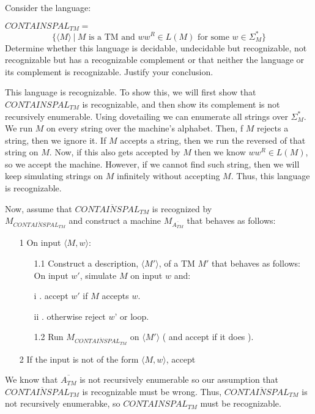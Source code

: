

Consider the language:

$CONTAINSPAL_{TM} =$
	\[  \{ \langle M \rangle ~|~ M \mbox{ is a TM and } ww^R \in L(M) \mbox{ for some } w \in \Sigma_M^* \}
	\]	
	Determine whether this language is decidable, undecidable but recognizable, not recognizable but has a recognizable complement or that neither the language or its complement is recognizable. Justify your conclusion.
	
\begin{solution}

This language is recognizable. To show this, we will first show that $CONTAINSPAL_{TM}$ is recognizable, and then show its complement is not recursively enumerable. Using dovetailing we can enumerate all strings over $\Sigma_M^*$. We run $M$ on every string over the machine's alphabet. Then, f $M$ rejects a string, then we ignore it. If $M$ accepts a string, then we run the reversed of that string on $M$. Now, if this also gets accepted by $M$ then we know $ww^R \in L(M)$, so we accept the machine. However, if we cannot find such string, then we will keep simulating strings on $M$ infinitely without accepting $M$. Thus, this language is recognizable.

Now, assume that $\overline{CONTAINSPAL_{TM}}$ is recognized by\\ $M_{\overline{CONTAINSPAL_{TM}}}$ and construct a machine $M_{\overline{A_{TM}}}$ that behaves as follows:
\begin{enumerate}
	\item [1]On input $\langle M,w \rangle$:
	\begin{enumerate}
		\item 	[1.1] Construct a description, $\langle M' \rangle $, of a TM $M'$ that behaves as
		follows:\\
		On input $w'$, simulate $M$ on input $w$ and:
		\item [i]. accept $w'$ if $M$ accepts $w$.
		\item [ii]. otherwise reject $w’$ or loop.
		\item [1.2] Run $M_{\overline{CONTAINSPAL_{TM}}}$ on $\langle M' \rangle $ ( and accept if it does ).
	\end{enumerate}
	\item [2] If the input is not of the form $\langle M,w \rangle$, accept
\end{enumerate}
We know that $\overline{A_{TM}}$ is not recursively enumerable so our assumption that $\overline{CONTAINSPAL_{TM}}$ is recognizable must be wrong. Thus, $\overline{CONTAINSPAL_{TM}}$ is not recursively enumerabke, so $CONTAINSPAL_{TM}$ must be recognizable.

\end{solution}
